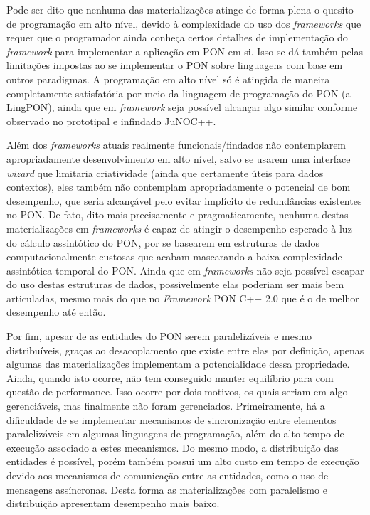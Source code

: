 Pode ser dito que nenhuma das materializações atinge de forma plena o quesito de
programação em alto nível, devido à complexidade do uso dos \textit{frameworks}
que requer que o programador ainda conheça certos detalhes de implementação do
\textit{framework} para implementar a aplicação em PON em si. Isso se dá também
pelas limitações impostas ao se implementar o PON sobre linguagens com base em
outros paradigmas. A programação em alto nível só é atingida de maneira
completamente satisfatória por meio da linguagem de programação do PON (a
LingPON), ainda que em \textit{framework} seja possível alcançar algo similar
conforme observado no prototipal e infindado JuNOC++.

Além dos \textit{frameworks} atuais realmente funcionais/findados não
contemplarem apropriadamente desenvolvimento em alto nível, salvo se usarem uma
interface \textit{wizard} que limitaria criatividade (ainda que certamente úteis
para dados contextos), eles também não contemplam apropriadamente o potencial de
bom desempenho, que seria alcançável pelo evitar implícito de redundâncias
existentes no PON. De fato, dito mais precisamente e pragmaticamente, nenhuma
destas materializações em \textit{frameworks} é capaz de atingir o desempenho
esperado à luz do cálculo assintótico do PON, por se basearem em estruturas de
dados computacionalmente custosas que acabam mascarando a baixa complexidade
assintótica-temporal do PON. Ainda que em \textit{frameworks} não seja possível
escapar do uso destas estruturas de dados, possivelmente elas poderiam ser
mais bem articuladas, mesmo mais do que no \textit{Framework} PON C++ 2.0 que é
o de melhor desempenho até então.

Por fim, apesar de as entidades do PON serem paralelizáveis e mesmo
distribuíveis, graças ao desacoplamento que existe entre elas por definição,
apenas algumas das materializações implementam a potencialidade dessa
propriedade. Ainda, quando isto ocorre, não tem conseguido manter equilíbrio
para com questão de performance. Isso ocorre por dois motivos, os quais seriam
em algo gerenciáveis, mas finalmente não foram gerenciados. Primeiramente, há a
dificuldade de se implementar mecanismos de sincronização entre elementos
paralelizáveis em algumas linguagens de programação, além do alto tempo de
execução associado a estes mecanismos. Do mesmo modo, a distribuição das
entidades é possível, porém também possui um alto custo em tempo de execução
devido aos mecanismos de comunicação entre as entidades, como o uso de mensagens
assíncronas. Desta forma as materializações com paralelismo e distribuição
apresentam desempenho mais baixo.

